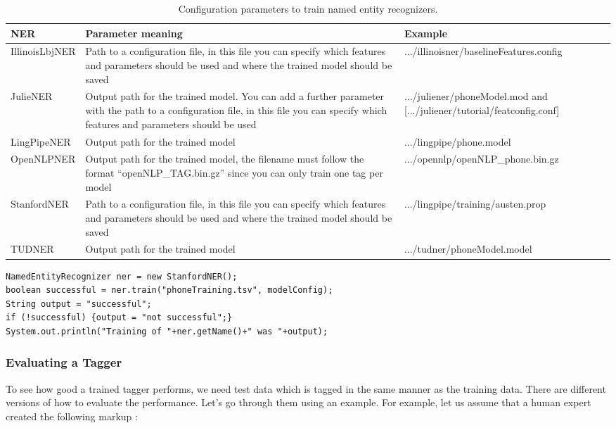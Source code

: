 \documentclass[a4paper,twoside]{book}      %
\begin{document}
\begin{table}[ht]
\centering
\begin{tabularx}{\linewidth}{|l|X|X|}
\hline
NER		& Parameter meaning & Example \\
\hline
IllinoisLbjNER	& Path to a configuration file, in this file you can specify which features and parameters should be used and where the trained model should be saved &	.../illinoisner/baselineFeatures.config \\
\hline
JulieNER	& Output path for the trained model. You can add a further parameter with the path to a configuration file, in this file you can specify which features and parameters should be used &	.../juliener/phoneModel.mod and [.../juliener/tutorial/featconfig.conf] \\
\hline
LingPipeNER	& Output path for the trained model &	.../lingpipe/phone.model \\
\hline
OpenNLPNER	& Output path for the trained model, the filename must follow the format ``openNLP\_TAG.bin.gz'' since you can only train one tag per model &	.../opennlp/openNLP\_phone.bin.gz \\
\hline
StanfordNER	& Path to a configuration file, in this file you can specify which features and parameters should be used and where the trained model should be saved &	.../lingpipe/training/austen.prop \\
\hline
TUDNER	& Output path for the trained model &	.../tudner/phoneModel.model \\
\hline
\end{tabularx} 
\caption{Configuration parameters to train named entity recognizers.}
\label{tab:nerConfig}
\end{table}

\begin{codelisting}
\label{listing:trainNER}
\begin{lstlisting}[frame=tb]
NamedEntityRecognizer ner = new StanfordNER();
boolean successful = ner.train("phoneTraining.tsv", modelConfig);
String output = "successful";
if (!successful) {output = "not successful";}
System.out.println("Training of "+ner.getName()+" was "+output);
\end{lstlisting}
\end{codelisting}

\subsubsection{Evaluating a Tagger}
To see how good a trained tagger performs, we need test data which is tagged in the same manner as the training data. There are different versions of how to evaluate the performance. Let's go through them using an example. For example, let us assume that a human expert created the following markup \cite{nadeau2007yooname}:
\end{document}
